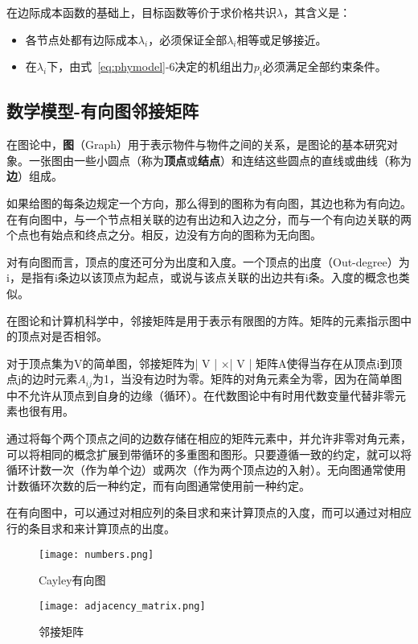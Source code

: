 在边际成本函数的基础上，目标函数等价于求价格共识$\lambda$，其含义是：

\begin{itemize}
    \item 各节点处都有边际成本$\lambda_{i}$，必须保证全部$\lambda_{i}$相等或足够接近。
    \item 在$\lambda_{i}$下，由式~\ref{eq:phymodel}-6决定的机组出力$p_{i}$必须满足全部约束条件。
\end{itemize}

\subsection{数学模型-有向图邻接矩阵}

在图论中，\textbf{图}（Graph）用于表示物件与物件之间的关系，是图论的基本研究对象。一张图由一些小圆点（称为\textbf{顶点}或\textbf{结点}）和连结这些圆点的直线或曲线（称为\textbf{边}）组成。

如果给图的每条边规定一个方向，那么得到的图称为有向图，其边也称为有向边。在有向图中，与一个节点相关联的边有出边和入边之分，而与一个有向边关联的两个点也有始点和终点之分。相反，边没有方向的图称为无向图。

对有向图而言，顶点的度还可分为出度和入度。一个顶点的出度（Out-degree）为i，是指有i条边以该顶点为起点，或说与该点关联的出边共有i条。入度的概念也类似。

在图论和计算机科学中，邻接矩阵是用于表示有限图的方阵。矩阵的元素指示图中的顶点对是否相邻。

对于顶点集为V的简单图，邻接矩阵为| V | ×| V | 矩阵A使得当存在从顶点i到顶点j的边时元素$A_{ij}$为1，当没有边时为零。矩阵的对角元素全为零，因为在简单图中不允许从顶点到自身的边缘（循环）。在代数图论中有时用代数变量代替非零元素也很有用。

通过将每个两个顶点之间的边数存储在相应的矩阵元素中，并允许非零对角元素，可以将相同的概念扩展到带循环的多重图和图形。只要遵循一致的约定，就可以将循环计数一次（作为单个边）或两次（作为两个顶点边的入射）。无向图通常使用计数循环次数的后一种约定，而有向图通常使用前一种约定。

在有向图中，可以通过对相应列的条目求和来计算顶点的入度，而可以通过对相应行的条目求和来计算顶点的出度。

\begin{figure}
    \begin{minipage}{0.48\textwidth}
      \centering
      \texttt{[image: numbers.png]}
      \caption{Cayley有向图}
      \label{fig:Directed-Cayley-graph}
    \end{minipage}\hfill
    \begin{minipage}{0.48\textwidth}
      \centering
      \texttt{[image: adjacency\_matrix.png]}
      \caption{邻接矩阵}
      \label{fig:Adjacency-matrix}
    \end{minipage}
\end{figure}

